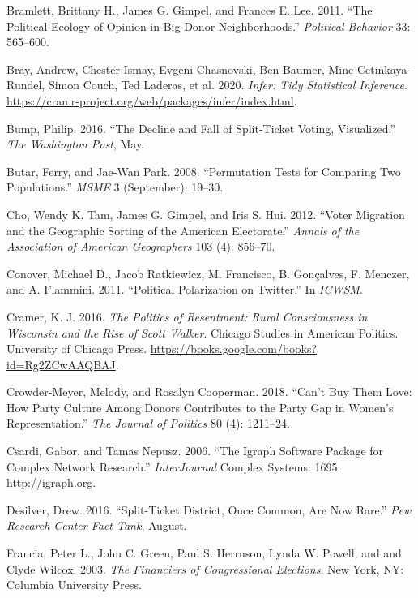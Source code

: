 \documentclass[12pt,]{article}
\begin{document}
\leavevmode\hypertarget{ref-bramlett2011}{}%
Bramlett, Brittany H., James G. Gimpel, and Frances E. Lee. 2011. ``The
Political Ecology of Opinion in Big-Donor Neighborhoods.''
\emph{Political Behavior} 33: 565--600.

\leavevmode\hypertarget{ref-infer}{}%
Bray, Andrew, Chester Ismay, Evgeni Chasnovski, Ben Baumer, Mine
Cetinkaya-Rundel, Simon Couch, Ted Laderas, et al. 2020. \emph{Infer:
Tidy Statistical Inference}.
\url{https://cran.r-project.org/web/packages/infer/index.html}.

\leavevmode\hypertarget{ref-bump2016}{}%
Bump, Philip. 2016. ``The Decline and Fall of Split-Ticket Voting,
Visualized.'' \emph{The Washington Post}, May.

\leavevmode\hypertarget{ref-butar2008}{}%
Butar, Ferry, and Jae-Wan Park. 2008. ``Permutation Tests for Comparing
Two Populations.'' \emph{MSME} 3 (September): 19--30.

\leavevmode\hypertarget{ref-cho2012}{}%
Cho, Wendy K. Tam, James G. Gimpel, and Iris S. Hui. 2012. ``Voter
Migration and the Geographic Sorting of the American Electorate.''
\emph{Annals of the Association of American Geographers} 103 (4):
856--70.

\leavevmode\hypertarget{ref-conover2011}{}%
Conover, Michael D., Jacob Ratkiewicz, M. Francisco, B. Gonçalves, F.
Menczer, and A. Flammini. 2011. ``Political Polarization on Twitter.''
In \emph{ICWSM}.

\leavevmode\hypertarget{ref-cramer2016}{}%
Cramer, K. J. 2016. \emph{The Politics of Resentment: Rural
Consciousness in Wisconsin and the Rise of Scott Walker}. Chicago
Studies in American Politics. University of Chicago Press.
\url{https://books.google.com/books?id=Rg2ZCwAAQBAJ}.

\leavevmode\hypertarget{ref-crowder-meyer2018}{}%
Crowder-Meyer, Melody, and Rosalyn Cooperman. 2018. ``Can't Buy Them
Love: How Party Culture Among Donors Contributes to the Party Gap in
Women's Representation.'' \emph{The Journal of Politics} 80 (4):
1211--24.

\leavevmode\hypertarget{ref-igraph}{}%
Csardi, Gabor, and Tamas Nepusz. 2006. ``The Igraph Software Package for
Complex Network Research.'' \emph{InterJournal} Complex Systems: 1695.
\url{http://igraph.org}.

\leavevmode\hypertarget{ref-desilver2016}{}%
Desilver, Drew. 2016. ``Split-Ticket District, Once Common, Are Now
Rare.'' \emph{Pew Research Center Fact Tank}, August.

\leavevmode\hypertarget{ref-francia2003}{}%
Francia, Peter L., John C. Green, Paul S. Herrnson, Lynda W. Powell, and
and Clyde Wilcox. 2003. \emph{The Financiers of Congressional
Elections}. New York, NY: Columbia University Press.
\end{document}

